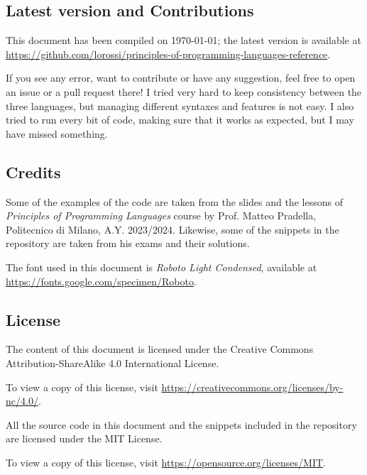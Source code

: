 \documentclass[a4paper,landscape,10pt]{article}
\begin{document}
\subsection{Latest version and Contributions}

This document has been compiled on \today;
the latest version is available at \url{https://github.com/lorossi/principles-of-programming-languages-reference}.

If you see any error, want to contribute or have any suggestion, feel free to open an issue or a pull request there!
I tried very hard to keep consistency between the three languages, but managing different syntaxes and features is not easy.
I also tried to run every bit of code, making sure that it works as expected, but I may have missed something.

\bigskip

\subsection{Credits}

Some of the examples of the code are taken from the slides and the lessons of \textit{Principles of Programming Languages} course by Prof. Matteo Pradella, Politecnico di Milano, A.Y. 2023/2024.
Likewise, some of the snippets in the repository are taken from his exams and their solutions.

\smallskip

The font used in this document is \textit{Roboto Light Condensed}, available at \url{https://fonts.google.com/specimen/Roboto}.

\bigskip

\subsection{License}

The content of this document is licensed under the Creative Commons Attribution-ShareAlike 4.0 International License.

To view a copy of this license, visit \url{https://creativecommons.org/licenses/by-nc/4.0/}.
\ccbync

\smallskip

All the source code in this document and the snippets included in the repository are licensed under the MIT License.

To view a copy of this license, visit \url{https://opensource.org/licenses/MIT}.
\end{document}
